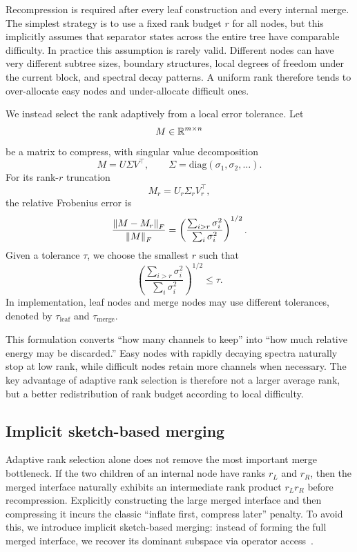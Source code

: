 Recompression is required after every leaf construction and every internal merge. The simplest strategy is to use a fixed rank budget $r$ for all nodes, but this implicitly assumes that separator states across the entire tree have comparable difficulty. In practice this assumption is rarely valid. Different nodes can have very different subtree sizes, boundary structures, local degrees of freedom under the current block, and spectral decay patterns. A uniform rank therefore tends to over-allocate easy nodes and under-allocate difficult ones.

We instead select the rank adaptively from a local error tolerance. Let
\[
M \in \mathbb{R}^{m \times n}
\]
be a matrix to compress, with singular value decomposition
\[
M = U \Sigma V^\top,
\qquad
\Sigma = \mathrm{diag}(\sigma_1,\sigma_2,\ldots).
\]
For its rank-$r$ truncation
\[
M_r = U_r \Sigma_r V_r^\top,
\]
the relative Frobenius error is
\[
\frac{\left\lVert M-M_r \right\rVert_F}{\left\lVert M \right\rVert_F}
=
\left(
\frac{\sum_{i>r}\sigma_i^2}{\sum_i \sigma_i^2}
\right)^{1/2}.
\]
Given a tolerance $\tau$, we choose the smallest $r$ such that
\[
\left(
\frac{\sum_{i>r}\sigma_i^2}{\sum_i \sigma_i^2}
\right)^{1/2}
\le \tau.
\]
In implementation, leaf nodes and merge nodes may use different tolerances, denoted by $\tau_{\mathrm{leaf}}$ and $\tau_{\mathrm{merge}}$.

This formulation converts ``how many channels to keep'' into ``how much relative energy may be discarded.'' Easy nodes with rapidly decaying spectra naturally stop at low rank, while difficult nodes retain more channels when necessary. The key advantage of adaptive rank selection is therefore not a larger average rank, but a better redistribution of rank budget according to local difficulty.

\subsection{Implicit sketch-based merging}

Adaptive rank selection alone does not remove the most important merge bottleneck. If the two children of an internal node have ranks $r_L$ and $r_R$, then the merged interface naturally exhibits an intermediate rank product $r_Lr_R$ before recompression. Explicitly constructing the large merged interface and then compressing it incurs the classic ``inflate first, compress later'' penalty. To avoid this, we introduce implicit sketch-based merging: instead of forming the full merged interface, we recover its dominant subspace via operator access~\cite{halko2011finding,heddes2026approximating}.

